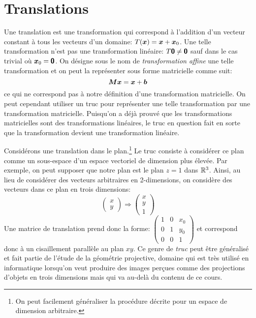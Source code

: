 \section{Translations}
Une translation est une transformation qui correspond à l'addition d'un vecteur constant à tous les vecteurs d'un domaine: $T(\boldsymbol{x}) = \boldsymbol{x} + \boldsymbol{x}_0$.
Une telle transformation n'est pas une transformation linéaire: $T\boldsymbol{\mbox{\textsf{\textbf{{0}}}}} \neq \mbox{\textsf{\textbf{{0}}}}$ sauf dans le cas trivial où $\boldsymbol{x}_0 = \mbox{\textsf{\textbf{{0}}}}$.  On désigne sous le nom de \textit{transformation affine} une telle transformation et on peut la représenter sous forme
matricielle comme suit:
\[
\boldsymbol{M}\boldsymbol{x} = \boldsymbol{x} + \boldsymbol{b}
\]
ce qui ne correspond pas à notre définition d'une transformation matricielle.
On peut cependant utiliser un truc pour représenter une telle transformation par une transformation matricielle.  
Puisqu'on a déjà prouvé que les transformations matricielles sont des transformations linéaires, le truc en question fait en sorte
que la transformation devient une transformation linéaire.

Considérons une translation dans le plan.\footnote{On peut facilement généraliser la procédure décrite pour
un espace de dimension arbitraire.}
Le truc consiste à considérer ce plan comme un sous-espace d'un espace vectoriel de dimension plus élevée.
Par exemple, on peut supposer que notre plan est le plan $z=1$ dans $\mathbb{R}^3$.
Ainsi, au lieu de considérer des vecteurs arbitraires en 2-dimensions, on considère des vecteurs dans ce plan
en trois dimensions:
\[
\begin{pmatrix}
x\\y
\end{pmatrix} \Longrightarrow
\begin{pmatrix}
x \\ y \\ 1
\end{pmatrix}
\]
Une matrice de translation prend donc la forme:
$\displaystyle
\begin{pmatrix}
1 & 0 & x_0 \\
0 & 1 & y_0 \\
0 & 0 & 1
\end{pmatrix}
$
et correspond donc à un cisaillement parallèle au plan $xy$.
Ce genre de \textit{truc} peut être généralisé et fait partie de l'étude de la géométrie projective, domaine
qui est très utilisé en informatique lorsqu'on veut produire des images perçues comme des projections
d'objets en trois dimensions mais qui va au-delà du contenu de ce cours.

